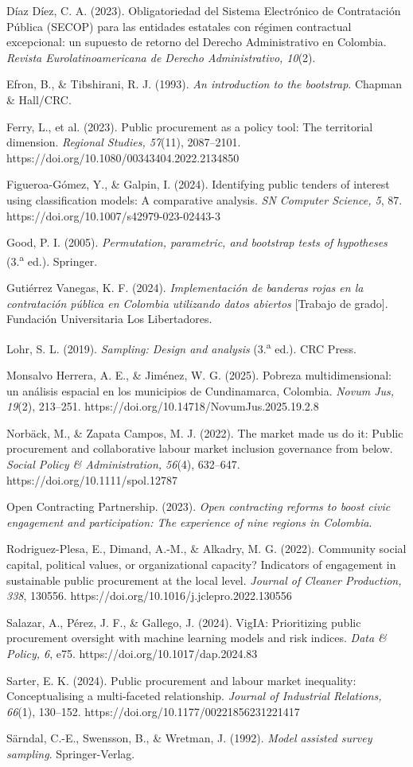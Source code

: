 \documentclass[11pt,letterpaper]{article}
\begin{document}
Díaz Díez, C. A. (2023). Obligatoriedad del Sistema Electrónico de
Contratación Pública (SECOP) para las entidades estatales con régimen
contractual excepcional: un supuesto de retorno del Derecho Administrativo en
Colombia. \textit{Revista Eurolatinoamericana de Derecho Administrativo,
10}(2).

Efron, B., \& Tibshirani, R. J. (1993). \textit{An introduction to the
bootstrap}. Chapman \& Hall/CRC.

Ferry, L., et al. (2023). Public procurement as a policy tool: The territorial
dimension. \textit{Regional Studies, 57}(11), 2087--2101.
https://doi.org/10.1080/00343404.2022.2134850

Figueroa-Gómez, Y., \& Galpin, I. (2024). Identifying public tenders of
interest using classification models: A comparative analysis. \textit{SN
Computer Science, 5}, 87. https://doi.org/10.1007/s42979-023-02443-3

Good, P. I. (2005). \textit{Permutation, parametric, and bootstrap tests of
hypotheses} (3.\textsuperscript{a} ed.). Springer.

Gutiérrez Vanegas, K. F. (2024). \textit{Implementación de banderas rojas en
la contratación pública en Colombia utilizando datos abiertos} [Trabajo de
grado]. Fundación Universitaria Los Libertadores.

Lohr, S. L. (2019). \textit{Sampling: Design and analysis}
(3.\textsuperscript{a} ed.). CRC Press.

Monsalvo Herrera, A. E., \& Jiménez, W. G. (2025). Pobreza multidimensional:
un análisis espacial en los municipios de Cundinamarca, Colombia.
\textit{Novum Jus, 19}(2), 213--251.
https://doi.org/10.14718/NovumJus.2025.19.2.8

Norbäck, M., \& Zapata Campos, M. J. (2022). The market made us do it: Public
procurement and collaborative labour market inclusion governance from below.
\textit{Social Policy \& Administration, 56}(4), 632--647.
https://doi.org/10.1111/spol.12787

Open Contracting Partnership. (2023). \textit{Open contracting reforms to
boost civic engagement and participation: The experience of nine regions in
Colombia}.

Rodriguez-Plesa, E., Dimand, A.-M., \& Alkadry, M. G. (2022). Community social
capital, political values, or organizational capacity? Indicators of
engagement in sustainable public procurement at the local level.
\textit{Journal of Cleaner Production, 338}, 130556.
https://doi.org/10.1016/j.jclepro.2022.130556

Salazar, A., Pérez, J. F., \& Gallego, J. (2024). VigIA: Prioritizing public
procurement oversight with machine learning models and risk indices.
\textit{Data \& Policy, 6}, e75. https://doi.org/10.1017/dap.2024.83

Sarter, E. K. (2024). Public procurement and labour market inequality:
Conceptualising a multi-faceted relationship. \textit{Journal of Industrial
Relations, 66}(1), 130--152. https://doi.org/10.1177/00221856231221417

Särndal, C.-E., Swensson, B., \& Wretman, J. (1992). \textit{Model assisted
survey sampling}. Springer-Verlag.
\end{document}
